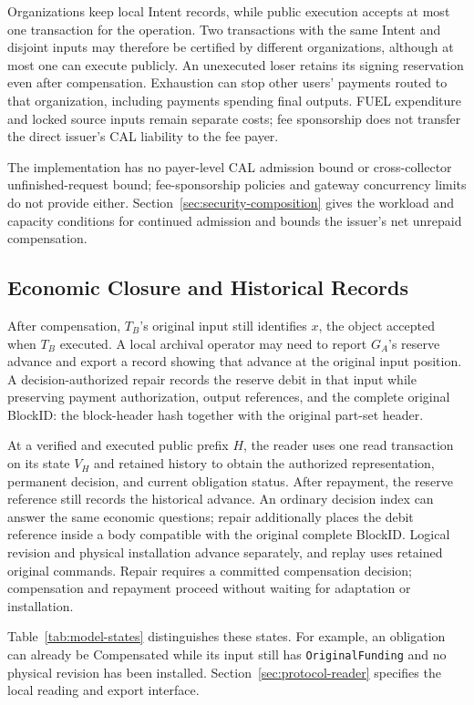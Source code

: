 Organizations keep local Intent records, while public execution accepts at most one transaction for the operation. Two transactions with the same Intent and disjoint inputs may therefore be certified by different organizations, although at most one can execute publicly. An unexecuted loser retains its signing reservation even after compensation. Exhaustion can stop other users' payments routed to that organization, including payments spending final outputs. FUEL expenditure and locked source inputs remain separate costs; fee sponsorship does not transfer the direct issuer's CAL liability to the fee payer.

The implementation has no payer-level CAL admission bound or cross-collector unfinished-request bound; fee-sponsorship policies and gateway concurrency limits do not provide either. Section~\ref{sec:security-composition} gives the workload and capacity conditions for continued admission and bounds the issuer's net unrepaid compensation.

\subsection{Economic Closure and Historical Records}
\label{sec:model-records}

After compensation, $T_B$'s original input still identifies $x$, the object accepted when $T_B$ executed. A local archival operator may need to report $G_A$'s reserve advance and export a record showing that advance at the original input position. A decision-authorized repair records the reserve debit in that input while preserving payment authorization, output references, and the complete original BlockID: the block-header hash together with the original part-set header.

At a verified and executed public prefix $H$, the reader uses one read transaction on its state $V_H$ and retained history to obtain the authorized representation, permanent decision, and current obligation status. After repayment, the reserve reference still records the historical advance. An ordinary decision index can answer the same economic questions; repair additionally places the debit reference inside a body compatible with the original complete BlockID. Logical revision and physical installation advance separately, and replay uses retained original commands. Repair requires a committed compensation decision; compensation and repayment proceed without waiting for adaptation or installation.

Table~\ref{tab:model-states} distinguishes these states. For example, an obligation can already be Compensated while its input still has \texttt{OriginalFunding} and no physical revision has been installed. Section~\ref{sec:protocol-reader} specifies the local reading and export interface.



